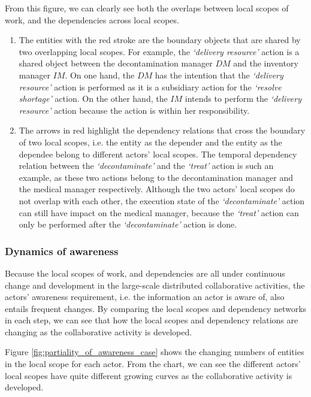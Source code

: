 From this figure, we can clearly see both the overlaps between local scopes of work, and the dependencies across local scopes. 

\begin{enumerate}
	\item The entities with the red stroke are the boundary objects that are shared by two overlapping local scopes. For example, the \emph{`delivery resource'} action is a shared object between the decontamination manager $DM$ and the inventory manager $IM$. On one hand, the $DM$ has the intention that the \emph{`delivery resource'} action is performed as it is a subsidiary action for the \emph{`resolve shortage'} action. On the other hand, the $IM$ intends to perform the \emph{`delivery resource'} action because the action is within her responsibility. 
	\item The arrows in red highlight the dependency relations that cross the boundary of two local scopes, i.e. the entity as the depender and the entity as the dependee belong to different actors' local scopes. The temporal dependency relation between the \emph{`decontaminate'} and the \emph{`treat'} action is such an example, as these two actions belong to the decontamination manager and the medical manager respectively. Although the two actors' local scopes do not overlap with each other, the execution state of the \emph{`decontaminate'} action can still have impact on the medical manager, because the \emph{`treat'} action can only be performed after the \emph{`decontaminate'} action is done.
\end{enumerate} 

\subsubsection{Dynamics of awareness} %
\label{ssub:dynamics_of_awareness}
Because the local scopes of work, and dependencies are all under continuous change and development in the large-scale distributed collaborative activities, the actors' awareness requirement, i.e. the information an actor is aware of, also entails frequent changes. By comparing the local scopes and dependency networks in each step, we can see that how the local scopes and dependency relations are changing as the collaborative activity is developed.

Figure \ref{fig:partiality_of_awareness_case} shows the changing numbers of entities in the local scope for each actor. From the chart, we can see the different actors' local scopes have quite different growing curves as the collaborative activity is developed. 

